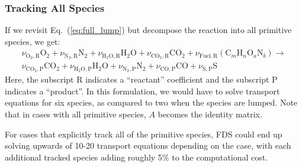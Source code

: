 \subsubsection{Tracking All Species}

If we revisit Eq.~(\ref{eq:full_lump}) but decompose the reaction into all primitive species, we get:
\begin{multline}\label{eq:prim}
\nu_{\mathrm{O}_{2},\mathrm{R}}\mathrm{O}_2+\nu_{\mathrm{N}_{2},\mathrm{R}}\mathrm{N}_2+\nu_{\mathrm{H}_{2}\mathrm{O},\mathrm{R}}\mathrm{H}_2\mathrm{O}+\nu_{\mathrm{CO}_{2},\mathrm{R}}\mathrm{CO}_2 + \nu_{\mathrm{Fuel},\mathrm{R}}(\mbox{C}_m\mbox{H}_n\mbox{O}_a\mbox{N}_b) \longrightarrow \\
\nu_{\mathrm{CO}_{2},\mathrm{P}}\mathrm{CO}_2+\nu_{\mathrm{H}_{2}\mathrm{O},\mathrm{P}}\mathrm{H}_2\mathrm{O}+\nu_{\mathrm{N}_{2},\mathrm{P}}\mathrm{N}_2+\nu_{\mathrm{CO},\mathrm{P}}\mathrm{CO}+\nu_{\mathrm{S},\mathrm{P}}\mathrm{S}
\end{multline}
Here, the subscript {\small R} indicates a ``reactant'' coefficient and the subscript {\small P} indicates a ``product''.  In this formulation, we would have to solve transport equations for six species, as compared to two when the species are lumped. Note that in cases with all primitive species, $A$ becomes the identity matrix.

For cases that explicitly track all of the primitive species, FDS could end up solving upwards of 10-20 transport equations depending on the case, with each additional tracked species adding roughly 5\% to the computational cost.



